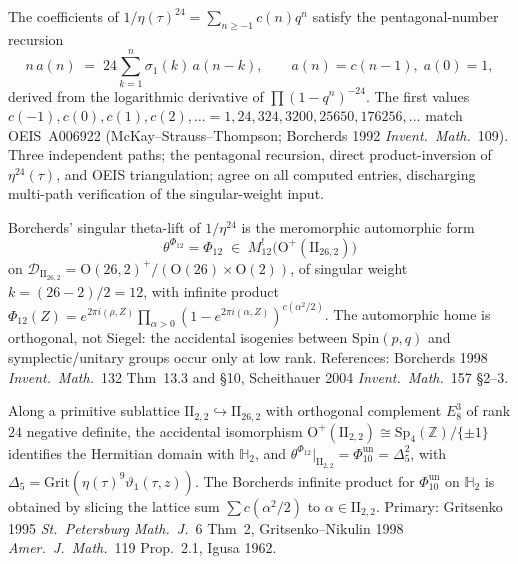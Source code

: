 \begin{theorem}
\label{thm:fake-monster-borcherds-coefficients}
The coefficients of $1/\eta(\tau)^{24} = \sum_{n\ge -1} c(n)q^n$ satisfy the
pentagonal-number recursion
\[
 n\,a(n) \;=\; 24\sum_{k=1}^n \sigma_1(k)\,a(n-k),\qquad a(n) = c(n-1),\;a(0) = 1,
\]
derived from the logarithmic derivative of
$\prod(1-q^n)^{-24}$. The first values
$c(-1), c(0), c(1), c(2), \ldots = 1, 24, 324, 3200, 25650, 176256,\ldots$
match OEIS~A006922 (McKay--Strauss--Thompson; Borcherds 1992
\emph{Invent.~Math.}~109). Three independent paths; the pentagonal
recursion, direct product-inversion of $\eta^{24}(\tau)$, and OEIS
triangulation; agree on all computed entries, discharging multi-path
verification of the singular-weight input.
\end{theorem}

\begin{theorem}
\label{thm:fake-monster-orthogonal-automorphic-home}
Borcherds' singular theta-lift of $1/\eta^{24}$ is the meromorphic
automorphic form
\[
 \theta^{\Phi_{12}} = \Phi_{12}\;\in\;M^!_{12}\!\bigl(\mathrm{O}^+(\mathrm{II}_{26,2})\bigr)
\]
on $\mathcal{D}_{\mathrm{II}_{26,2}} = \mathrm{O}(26,2)^+/(\mathrm{O}(26)\times\mathrm{O}(2))$,
of singular weight $k = (26-2)/2 = 12$, with infinite product
$\Phi_{12}(Z) = e^{2\pi i(\rho, Z)}\prod_{\alpha>0}(1-e^{2\pi i(\alpha,Z)})^{c(\alpha^2/2)}$.
The automorphic home is orthogonal, not Siegel: the accidental isogenies
between $\mathrm{Spin}(p,q)$ and symplectic/unitary groups occur only at
low rank. References: Borcherds 1998 \emph{Invent.~Math.}~132
Thm~13.3 and \S 10, Scheithauer 2004
\emph{Invent.~Math.}~157 \S 2--3.
\end{theorem}

\begin{theorem}
\label{thm:fake-monster-restriction-phi10}
Along a primitive sublattice $\mathrm{II}_{2,2}\hookrightarrow\mathrm{II}_{26,2}$
with orthogonal complement $E_8^3$ of rank $24$ negative definite, the
accidental isomorphism $\mathrm{O}^+(\mathrm{II}_{2,2})\cong
\mathrm{Sp}_4(\mathbb{Z})/\{\pm 1\}$ identifies the Hermitian domain with
$\mathbb{H}_2$, and
\(\theta^{\Phi_{12}}|_{\mathrm{II}_{2,2}}=\Phi_{10}^{\mathrm{un}}=\Delta_5^2\),
with $\Delta_5 = \mathrm{Grit}(\eta(\tau)^9\vartheta_1(\tau,z))$. The
Borcherds infinite product for \(\Phi_{10}^{\mathrm{un}}\) on $\mathbb{H}_2$ is obtained by
slicing the lattice sum $\sum c(\alpha^2/2)$ to
$\alpha\in\mathrm{II}_{2,2}$. Primary: Gritsenko 1995
\emph{St.~Petersburg Math.~J.}~6 Thm~2, Gritsenko--Nikulin 1998
\emph{Amer.~J.~Math.}~119 Prop.~2.1, Igusa 1962.
\end{theorem}

